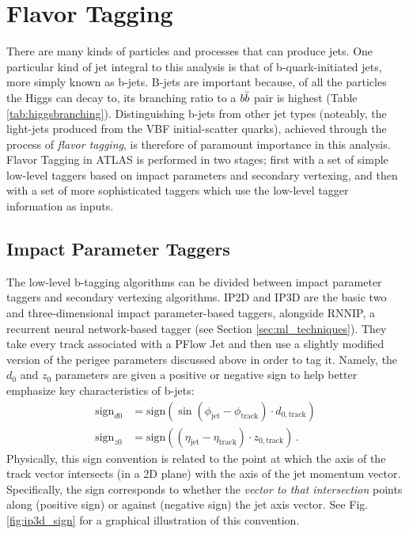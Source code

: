     \FloatBarrier
    \section{Flavor Tagging}
        
        There are many kinds of particles and processes that can produce jets.
        One particular kind of jet integral to this analysis is that of b-quark-initiated jets,
            more simply known as b-jets.
        B-jets are important because, of all the particles the Higgs can decay to,
            its branching ratio to a $b \bar{b}$ pair is highest (Table \ref{tab:higgsbranching}).
        Distinguishing b-jets from other jet types
            (noteably, the light-jets produced from the VBF initial-scatter quarks),
            achieved through the process of \textit{flavor tagging},
            is therefore of paramount importance in this analysis.
        Flavor Tagging in ATLAS is performed in two stages;
            first with a set of simple low-level taggers based on impact parameters and secondary vertexing,
            and then with a set of more sophisticated taggers which use the low-level tagger information as inputs.


        \FloatBarrier
        \subsection{Impact Parameter Taggers}

            The low-level b-tagging algorithms can be divided between impact parameter taggers and secondary vertexing algorithms.
            IP2D and IP3D are the basic two and three-dimensional impact parameter-based taggers, 
                alongside RNNIP\cite{rnnip}, a recurrent neural network-based tagger (see Section \ref{sec:ml_techniques}).
            They take every track associated with a PFlow Jet
                and then use a slightly modified version of the perigee parameters discussed above in order to tag it.
            Namely, the $d_0$ and $z_0$ parameters are given a positive or negative sign to help better emphasize key characteristics of b-jets\cite{thesis_giacinto}:
            \begin{equation} \begin{split}
                \textrm{sign}_{d0} &= \textrm{sign}(\sin(\phi_{\textrm{jet}} - \phi_{\textrm{track}}) \cdot d_{0,\textrm{track}}) \\
                \textrm{sign}_{z0} &= \textrm{sign}((\eta_{\textrm{jet}} - \eta_{\textrm{track}}) \cdot z_{0,\textrm{track}})
                \,.
            \end{split} \end{equation}
            Physically, this sign convention is related to the point at which the axis of the track vector intersects
                (in a 2D plane) with the axis of the jet momentum vector. 
            Specifically, the sign corresponds to whether the \textit{vector to that intersection}
                points along (positive sign) or against (negative sign) the jet axis vector.
            See Fig. \ref{fig:ip3d_sign} for a graphical illustration of this convention.

